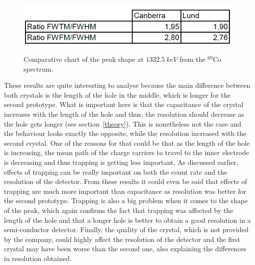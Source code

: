 \documentclass[11pt,a4paper]{article}
\begin{document}
\begin{figure}[!h]
\centering
\caption{Comparative chart of the peak shape at $1332.5~keV$ from the $^{60}$Co spectrum.}
\includegraphics[scale=0.7]{shape.png}
\label{shape2}
\end{figure}
These results are quite interesting to analyse because the main difference between both crystals is the length of the hole in the middle, which is longer for the second prototype. What is important here is that the capacitance of the crystal increases with the length of the hole and thus, the resolution should decrease as the hole gets longer (see section~\ref{theory}). This is nonetheless not the case and the behaviour looks exactly the opposite, while the resolution increased with the second crystal. One of the reasons for that could be that as the length of the hole is increasing, the mean path of the charge carriers to travel to the inner electrode is decreasing and thus trapping is getting less important. As discussed earlier, effects of trapping can be really important on both the count rate and the resolution of the detector. From these results it could even be said that effects of trapping are much more important than capacitance as resolution was better for the second prototype. Trapping is also a big problem when it comes to the shape of the peak, which again confirms the fact that trapping was affected by the length of the hole and that a longer hole is better to obtain a good resolution in a semi-conductor detector. Finally, the quality of the crystal, which is not provided by the company, could highly affect the resolution of the detector and the first crystal may have been worse than the second one, also explaining the differences in resolution obtained.
\end{document}
